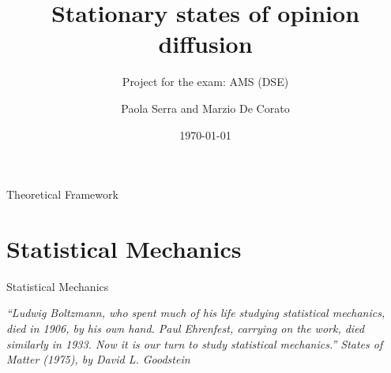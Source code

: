 \documentclass{beamer}
\title[AMS project]{ Stationary states of opinion diffusion}
\subtitle{Project for the exam: AMS (DSE)}
\author{Paola Serra and Marzio De Corato }
\date{\today}
\begin{document}
\begin{frame}
\vspace{+4 cm}  \titlepage
\end{frame}

\usebackgroundtemplate{ } 






\begin{frame}{}
\begin{center}
{\Huge Theoretical Framework}
\end{center}
\end{frame}


\section{Statistical Mechanics}

\begin{frame}{}
\begin{center}
{\Huge Statistical Mechanics}
\end{center}
\begin{center}
\textit{“Ludwig Boltzmann, who spent much of his life studying statistical mechanics, died in 1906, by his own hand. Paul Ehrenfest, carrying on the work, died similarly in 1933. Now it is our turn to study statistical mechanics.” States of Matter (1975), by David L. Goodstein}
\end{center}
\end{frame}
\end{document}
